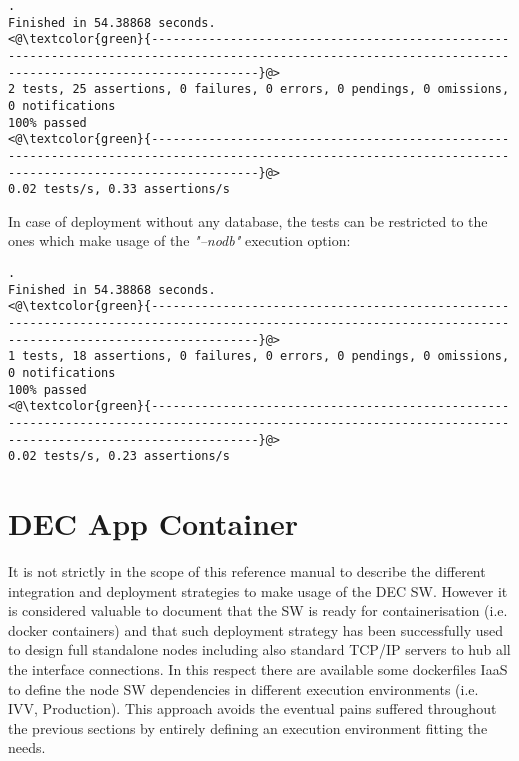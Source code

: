 \documentclass[dec_sum_main.tex]{subfiles}
\begin{document}
 \newline

\begin{lstlisting}
.
Finished in 54.38868 seconds.
<@\textcolor{green}{-----------------------------------------------------------------------------------------------------------------------------------------------------------}@>
2 tests, 25 assertions, 0 failures, 0 errors, 0 pendings, 0 omissions, 0 notifications
100% passed
<@\textcolor{green}{-----------------------------------------------------------------------------------------------------------------------------------------------------------}@>
0.02 tests/s, 0.33 assertions/s 
\end{lstlisting}

\noindent
\newline
In case of deployment without any database, the tests can be restricted to the ones which make usage of the \textit{"--nodb"} execution option:

 \newline

\begin{lstlisting}
.
Finished in 54.38868 seconds.
<@\textcolor{green}{-----------------------------------------------------------------------------------------------------------------------------------------------------------}@>
1 tests, 18 assertions, 0 failures, 0 errors, 0 pendings, 0 omissions, 0 notifications
100% passed
<@\textcolor{green}{-----------------------------------------------------------------------------------------------------------------------------------------------------------}@>
0.02 tests/s, 0.23 assertions/s
\end{lstlisting}

\section{DEC App Container}
It is not strictly in the scope of this reference manual to describe the different integration and deployment strategies to make usage of the DEC SW. However it is considered valuable to document that the SW is ready for containerisation (i.e. docker containers) and that such deployment strategy has been successfully used to design full standalone nodes including also standard TCP/IP servers to hub all the interface connections. In this respect there are available some dockerfiles IaaS to define the node SW dependencies in different execution environments (i.e. IVV, Production). This approach avoids the eventual pains suffered throughout the previous sections by entirely defining an execution environment fitting the needs. 
\end{document}
